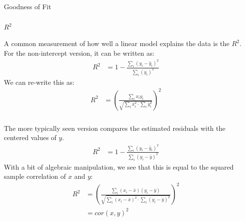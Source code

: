 \begin{frame}[fragile] \frametitle{}

\begin{flushright}
{\color{yaleblue}\sc\fontsize{1cm}{0cm}\selectfont Goodness of Fit}
\end{flushright}

\end{frame}

\begin{frame}[fragile] \frametitle{}

{\color{yaleblue}\fontsize{16pt}{20pt}\selectfont $R^2$}

A common measurement of how well a linear model explains
the data is the $R^2$. For the non-intercept version, it
can be written as:
\begin{align*}
R^2 &= 1 - \frac{\sum_i (y_i - \widehat{y}_i)^2}{\sum_i (y_i)^2}
\end{align*}
\pause We can re-write this as:
\begin{align*}
R^2 &= \left( \frac{\sum_i x_i y_i}{\sqrt{\sum_i x_i^2 \cdot \sum_i y_i^2}} \right)^2
\end{align*}

\end{frame}

\begin{frame}[fragile] \frametitle{}

The more typically seen version compares the estimated
residuals with the centered values of $y$.
\begin{align*}
R^2 &= 1 - \frac{\sum_i (y_i - \widehat{y}_i)^2}{\sum_i (y_i - \bar{y})^2}
\end{align*}
\pause With a bit of algebraic manipulation, we see that this is
equal to the squared sample correlation of $x$ and $y$:
\begin{align*}
R^2 &= \left( \frac{\sum_i (x_i - \bar{x})(y_i - \bar{y})}{\sqrt{\sum_i (x_i - \bar{x})^2 \cdot \sum_i (y_i - \bar{y})^2}} \right)^2 \\
&= cor(x,y)^2
\end{align*}

\end{frame}














